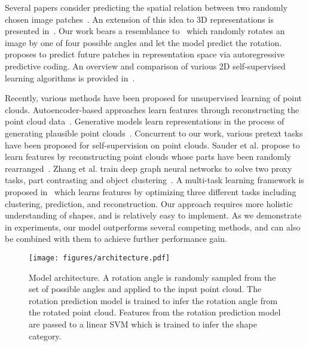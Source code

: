 \documentclass[10pt,twocolumn,letterpaper]{article}
\begin{document}
Several papers consider predicting the spatial relation between two randomly chosen image
patches~\cite{doersch2015unsupervised,nathan2018improvements,noroozi2016unsupervised,noroozi2018boosting}. An extension of this idea to 3D representations is presented in~\cite{sauder2019context}. 
Our work bears a resemblance to~\cite{gidaris2018unsupervised} which randomly rotates an image by one of four possible angles and let the model predict the rotation. 
~\cite{oord2018representation} proposes to predict future patches in representation space via autoregressive predictive coding.
An overview and comparison of various 2D self-supervised learning algorithms is provided in~\cite{kolesnikov2019revisiting,asano2019acritical}. 

Recently, various methods have been proposed for unsupervised learning of point clouds. Autoencoder-based approaches learn features through reconstructing the point cloud data~\cite{achlioptas2018learning,gadelha2018multiresolution,yang2018foldingnet,zhao20193d}. Generative models learn representations in the process of generating plausible point clouds~\cite{li2018point,sun2020pointgrow,thabet2020self,wu2016learning}. Concurrent to our work, various pretext tasks have been proposed for self-supervision on point clouds. Sauder et al. propose to learn features by reconstructing point clouds whose parts have been randomly rearranged~\cite{sauder2019context}. 
Zhang et al. train deep graph neural networks to solve two proxy tasks, part contrasting and object clustering~\cite{zhang2019unsupervised}.  
A multi-task learning framework is proposed in~\cite{hassani2019unsupervised} which learns features by optimizing three different tasks including clustering, prediction, and reconstruction. 
Our approach requires more holistic understanding of shapes, and is relatively easy to implement. As we demonstrate in experiments, our model outperforms several competing methods, and can also be combined with them to achieve further performance gain. 
\begin{figure*}[t]
\texttt{[image: figures/architecture.pdf]}
\caption{Model architecture. A rotation angle is randomly sampled from the set of possible angles and applied to the input point cloud. The rotation prediction model is trained to infer the rotation angle from the rotated point cloud. Features from the rotation prediction model are passed to a linear SVM which is trained to infer the shape category. }
\label{fig:architecture}
\end{figure*}
\end{document}
